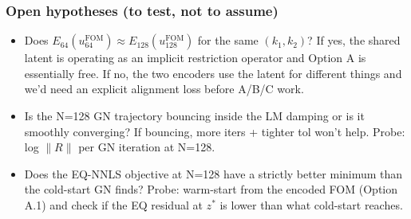 \subsubsection*{Open hypotheses (to test, not to assume)}
\begin{itemize}
  \item Does $E_{64}(u_{64}^{\text{FOM}}) \approx E_{128}(u_{128}^{\text{FOM}})$
        for the same $(k_1, k_2)$? If yes, the shared latent is operating as
        an implicit restriction operator and Option A is essentially free.
        If no, the two encoders use the latent for different things and we'd
        need an explicit alignment loss before A/B/C work.
  \item Is the N=128 GN trajectory bouncing inside the LM damping or is it
        smoothly converging? If bouncing, more iters + tighter tol won't help.
        Probe: log $\|R\|$ per GN iteration at N=128.
  \item Does the EQ-NNLS objective at N=128 have a strictly better minimum
        than the cold-start GN finds? Probe: warm-start from the encoded
        FOM (Option A.1) and check if the EQ residual at $z^\ast$ is lower
        than what cold-start reaches.
\end{itemize}
